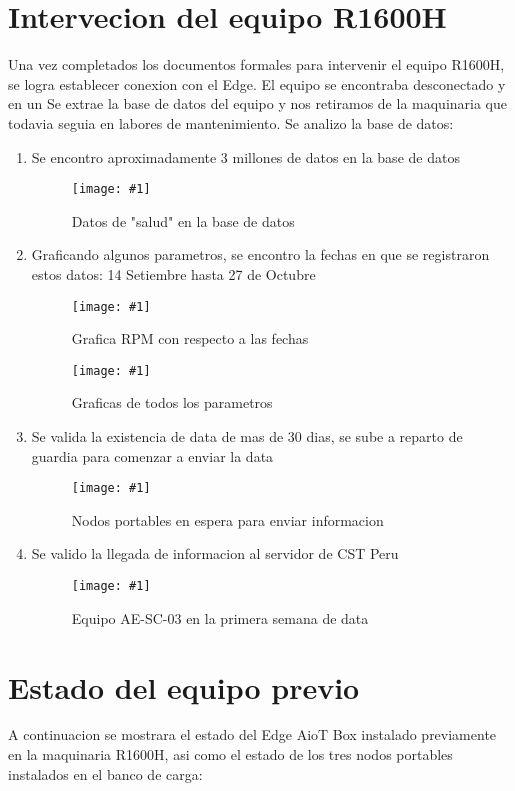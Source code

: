 \documentclass{article}
\newcommand{\vputfigure}[3]{%
  \begin{figure}[H]
    \centering
    \texttt{[image: \#1]}
    \captionsetup{font=scriptsize}
    \caption{#2}
    \label{#3}
  \end{figure}%
}
\newcommand{\hputfigure}[3]{%
  \begin{figure}[H]
    \centering
    \texttt{[image: \#1]}
    \captionsetup{font=scriptsize}
    \caption{#2}
    \label{#3}
  \end{figure}%
}
\begin{document}
\section{Intervecion del equipo R1600H}
Una vez completados los documentos formales para intervenir el equipo R1600H, se logra establecer conexion con el Edge.
El equipo se encontraba desconectado y en un 
\vspace{5mm}
\newline
Se extrae la base de datos del equipo y nos retiramos de la maquinaria que todavia seguia en labores de mantenimiento.
Se analizo la base de datos:
\begin{enumerate}
    \renewcommand{\labelenumi}{(\roman{enumi})}
    \item Se encontro aproximadamente 3 millones de datos en la base de datos
    \vputfigure{pictures/Edge_sql_aesa.jpg}{Datos de "salud" en la base de datos}{fig:edge_sql_data}

    \item Graficando algunos parametros, se encontro la fechas en que se registraron estos datos: 14 Setiembre hasta 27 de Octubre
    \vputfigure{pictures/Grafica_RPM_Fecha.jpg}{Grafica RPM con respecto a las fechas}{fig:rpm_graph}
    \vputfigure{pictures/Graficas_30_dias.jpg}{Graficas de todos los parametros}{fig:all_graphs}
    
    \item Se valida la existencia de data de mas de 30 dias, se sube a reparto de guardia para comenzar a enviar la data
    \hputfigure{pictures/Nodo_Portable_Banco_de_carga.jpg}{Nodos portables en espera para enviar informacion}{fig:banco_de_carga}

    \item Se valido la llegada de informacion al servidor de CST Peru
    \vputfigure{pictures/web_cst_peru.jpg}{Equipo AE-SC-03 en la primera semana de data}{fig:cst_web}
\end{enumerate}

\newpage 


\section{Estado del equipo previo}
A continuacion se mostrara el estado del Edge AioT Box instalado previamente en la maquinaria R1600H, asi como el estado de los tres nodos portables
instalados en el banco de carga:
\end{document}
